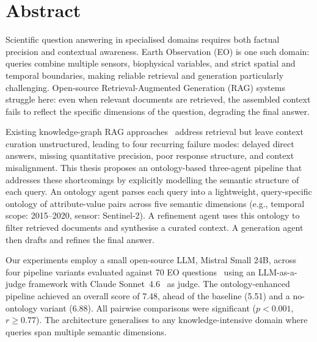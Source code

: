 \chapter*{Abstract}

Scientific question answering in specialised domains requires both factual precision and
contextual awareness. Earth Observation (EO) is one such domain: queries combine
multiple sensors, biophysical variables, and strict spatial and temporal boundaries,
making reliable retrieval and generation particularly challenging. Open-source
Retrieval-Augmented Generation (RAG) systems struggle here: even when relevant
documents are retrieved, the assembled context fails to reflect the specific dimensions
of the question, degrading the final answer.

Existing knowledge-graph RAG approaches~\citep{elbaff2025earthobservationrag} address
retrieval but leave context curation unstructured, leading to four recurring failure
modes: delayed direct answers, missing quantitative precision, poor response structure,
and context misalignment. This thesis proposes an ontology-based three-agent pipeline
that addresses these shortcomings by explicitly modelling the semantic structure of each
query. An ontology agent parses each query into a lightweight, query-specific ontology
of attribute-value pairs across five semantic dimensions (e.g., temporal scope:
2015--2020, sensor: Sentinel-2). A refinement agent uses this ontology to filter
retrieved documents and synthesise a curated context. A generation agent then drafts and
refines the final answer.

Our experiments employ a small open-source LLM, Mistral Small 24B, across four pipeline
variants evaluated against 70 EO questions~\citep{elbaff2025earthobservationrag} using
an LLM-as-a-judge framework with Claude Sonnet~4.6~\citep{anthropic2024claude} as
judge. The ontology-enhanced pipeline achieved an overall score of 7.48, ahead of the
baseline (5.51) and a no-ontology variant (6.88). All pairwise comparisons were
significant ($p < 0.001$, $r \geq 0.77$). The architecture generalises to any
knowledge-intensive domain where queries span multiple semantic dimensions.
